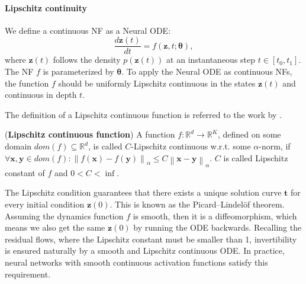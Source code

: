 
\paragraph{Lipschitz continuity}
We define a continuous \ac{NF} as a Neural \ac{ODE}:
\begin{equation}
    \label{eq:cnfode}
    \frac{d\boldsymbol{z}(t)}{dt}=f(\boldsymbol{z},t;\boldsymbol{\theta}),
\end{equation}
where $\boldsymbol{z}(t)$ follows the density $p(\boldsymbol{z}(t))$ at an instantaneous step $t\in[t_0, t_1]$. The \ac{NF} $f$ is parameterized by $\boldsymbol{\theta}$.
To apply the Neural \ac{ODE} as continuous \acp{NF}, the function $f$ should be uniformly Lipschitz continuous in the states $\boldsymbol{z}(t)$ and continuous in depth $t$. 

The definition of a Lipschitz continuous function is referred to the work by \citeauthor{khromov2024Lipschitz} \citeyearpar{khromov2024Lipschitz}.
\begin{definition}
(\textbf{Lipschitz continuous function}) A function $f:\mathbb{R}^d\rightarrow\mathbb{R}^K$, defined on some domain $dom(f)\subseteq \mathbb{R}^d$, is called $C$-Lipschitz continuous w.r.t. some $\alpha$-norm, if $\forall \boldsymbol{x}, \boldsymbol{y} \in dom(f):\left\| f(\boldsymbol{x})-f(\boldsymbol{y})\right\|_{\alpha}\leq C\left\| \boldsymbol{x}-\boldsymbol{y}\right\|_{\alpha}$. $C$ is called Lipschitz constant of $f$ and $0<C<\inf$.
\end{definition}

The Lipschitz condition guarantees that there exists a unique solution curve $\boldsymbol{t}$ for every initial condition $\boldsymbol{z}(0)$. This is known as the Picard–Lindel\"of theorem. Assuming the dynamics function $f$ is smooth, then it is a diffeomorphism, which means we also get the same $\boldsymbol{z}(0)$ by running the \ac{ODE} backwards. Recalling the residual flows, where the Lipschitz constant must be smaller than 1, invertibility is ensured naturally by a smooth and Lipschitz continuous \ac{ODE}. In practice, neural networks with smooth continuous activation functions satisfy this requirement.

